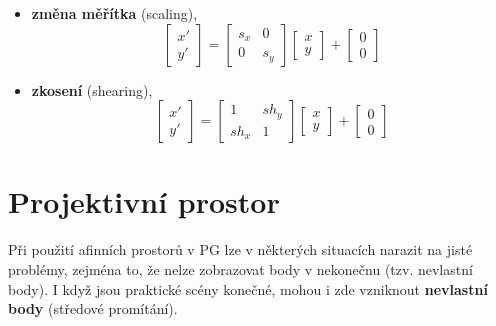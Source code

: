 \begin{itemize}
\begin{equation*}
          \end{equation*}
    \item \textbf{změna měřítka} (scaling),
          \begin{equation*}
              \begin{bmatrix}
                  x' \\[0.3em]
                  y'
              \end{bmatrix} =
              \begin{bmatrix}
                  s_x & 0   \\[0.3em]
                  0   & s_y
              \end{bmatrix}
              \begin{bmatrix}
                  x \\[0.3em]
                  y
              \end{bmatrix} +
              \begin{bmatrix}
                  0 \\[0.3em]
                  0
              \end{bmatrix}
          \end{equation*}
    \item \textbf{zkosení} (shearing),
          \begin{equation*}
              \begin{bmatrix}
                  x' \\[0.3em]
                  y'
              \end{bmatrix} =
              \begin{bmatrix}
                  1    & sh_y \\[0.3em]
                  sh_x & 1
              \end{bmatrix}
              \begin{bmatrix}
                  x \\[0.3em]
                  y
              \end{bmatrix} +
              \begin{bmatrix}
                  0 \\[0.3em]
                  0
              \end{bmatrix}
          \end{equation*}
\end{itemize}

\section{Projektivní prostor}
Při použití afinních prostorů v PG lze v některých situacích narazit na jisté problémy, zejména to, že nelze zobrazovat body v nekonečnu (tzv. nevlastní body). I když jsou praktické scény konečné, mohou i zde vzniknout \textbf{nevlastní body} (středové promítání).

